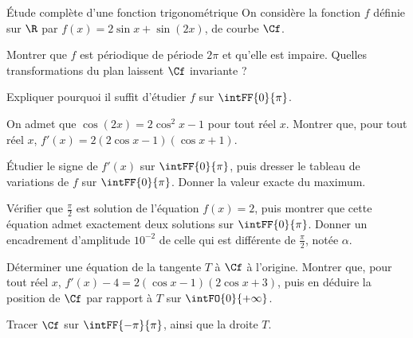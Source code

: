 \begin{exercice}[3]{Étude complète d'une fonction trigonométrique}
On considère la fonction $f$ définie sur $\R$ par $f(x)=2\sin x+\sin(2x)$, de courbe $\Cf$.
\begin{questions}
  \item Montrer que $f$ est périodique de période $2\pi$ et qu'elle est impaire. Quelles transformations du plan laissent
    $\Cf$ invariante ?
  \item Expliquer pourquoi il suffit d'étudier $f$ sur $\intFF{0}{\pi}$.
\end{questions}
\begin{questions}[resume]
  \item On admet que $\cos(2x)=2\cos^{2}x-1$ pour tout réel $x$. Montrer que, pour tout réel $x$,
    $f'(x)=2(2\cos x-1)(\cos x+1)$.
  \item Étudier le signe de $f'(x)$ sur $\intFF{0}{\pi}$, puis dresser le tableau de variations de $f$ sur $\intFF{0}{\pi}$.
    Donner la valeur exacte du maximum.
\end{questions}
\begin{questions}[resume]
  \item Vérifier que $\frac{\pi}{2}$ est solution de l'équation $f(x)=2$, puis montrer que cette équation admet exactement deux
    solutions sur $\intFF{0}{\pi}$. Donner un encadrement d'amplitude $10^{-2}$ de celle qui est différente de $\frac{\pi}{2}$, notée $\alpha$.
  \item Déterminer une équation de la tangente $T$ à $\Cf$ à l'origine. Montrer que, pour tout réel $x$,
    $f'(x)-4=2\left(\cos x-1\right)\left(2\cos x+3\right)$, puis en déduire la position de $\Cf$ par rapport à $T$ sur $\intFO{0}{+\infty}$.
  \item Tracer $\Cf$ sur $\intFF{-\pi}{\pi}$, ainsi que la droite $T$.
\end{questions}
\end{exercice}


